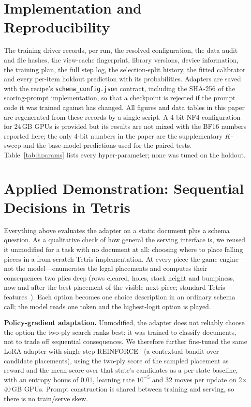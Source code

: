 \documentclass[conference]{IEEEtran}
\begin{document}



\section{Implementation and Reproducibility}
\label{app:impl}
The training driver records, per run, the resolved configuration, the data
audit and file hashes, the view-cache fingerprint, library versions, device
information, the training plan, the full step log, the selection-split history,
the fitted calibrator and every per-item holdout prediction with its
probabilities. Adapters are saved with the recipe's \texttt{schema\_config.json}
contract, including the SHA-256 of the scoring-prompt implementation, so that a
checkpoint is rejected if the prompt code it was trained against has changed.
All figures and data tables in this paper are regenerated from these records by
a single script. A 4-bit NF4 configuration for 24\,GB GPUs is provided but its
results are not mixed with the BF16 numbers reported here; the only 4-bit
numbers in the paper are the supplementary $K$-sweep and the base-model
predictions used for the paired tests. Table~\ref{tab:hparams} lists every
hyper-parameter; none was tuned on the holdout.



\section{Applied Demonstration: Sequential Decisions in Tetris}
\label{app:tetris}
Everything above evaluates the adapter on a static document plus a schema
question. As a qualitative check of how general the serving interface is, we
reused it unmodified for a task with no document at all: choosing where to
place falling pieces in a from-scratch Tetris implementation. At every piece
the game engine---not the model---enumerates the legal placements and computes
their consequences two plies deep (rows cleared, holes, stack height and
bumpiness, now and after the best placement of the visible next piece; standard
Tetris features~\cite{thiery2009tetris}). Each option becomes one choice
description in an ordinary schema call; the model reads one token and the
highest-logit option is played.

\textbf{Policy-gradient adaptation.} Unmodified, the adapter does not reliably
choose the option the two-ply search ranks best: it was trained to classify
documents, not to trade off sequential consequences. We therefore further
fine-tuned the same LoRA adapter with single-step REINFORCE~\cite{williams1992reinforce}
(a contextual bandit over candidate placements), using the two-ply score of the
sampled placement as reward and the mean score over that state's candidates as
a per-state baseline, with an entropy bonus of 0.01, learning rate
$10^{-5}$ and 32 moves per update on 2$\times$40\,GB GPUs. Prompt construction
is shared between training and serving, so there is no train/serve skew.
\end{document}
